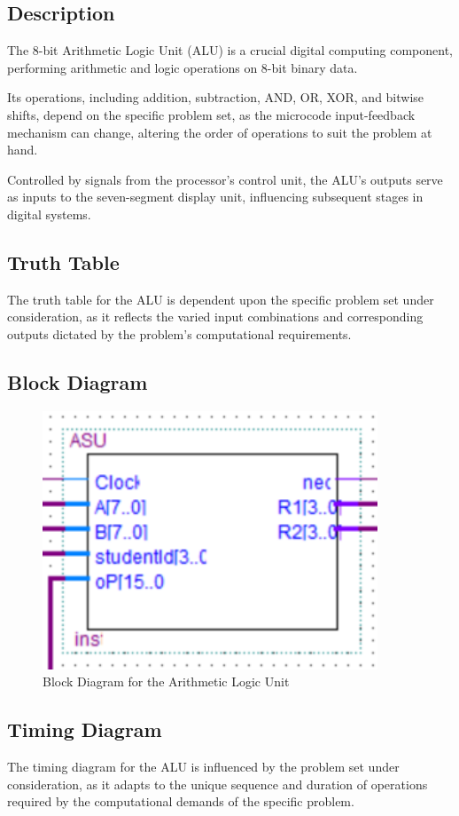 
\subsection{{Description}}

	{The 8-bit Arithmetic Logic Unit (ALU) is a crucial digital computing component, performing arithmetic and logic operations on 8-bit binary data.}
	
	{Its operations, including addition, subtraction, AND, OR, XOR, and bitwise shifts, depend on the specific problem set, as the microcode input-feedback mechanism can change, altering the order of operations to suit the problem at hand.}
	
	{Controlled by signals from the processor's control unit, the ALU's outputs serve as inputs to the seven-segment display unit, influencing subsequent stages in digital systems.}

\subsection{{Truth Table}}

	{The truth table for the ALU is dependent upon the specific problem set under consideration, as it reflects the varied input combinations and corresponding outputs dictated by the problem's computational requirements.}

\subsection{{Block Diagram}}

	\begin{figure}[H]
		\centering
		\includegraphics[width=10cm]{Pictures/ALU.png}
		\caption{{Block Diagram for the Arithmetic Logic Unit}}
		\label{}
	\end{figure}


\subsection{{Timing Diagram}}

	{The timing diagram for the ALU is influenced by the problem set under consideration, as it adapts to the unique sequence and duration of operations required by the computational demands of the specific problem.}
